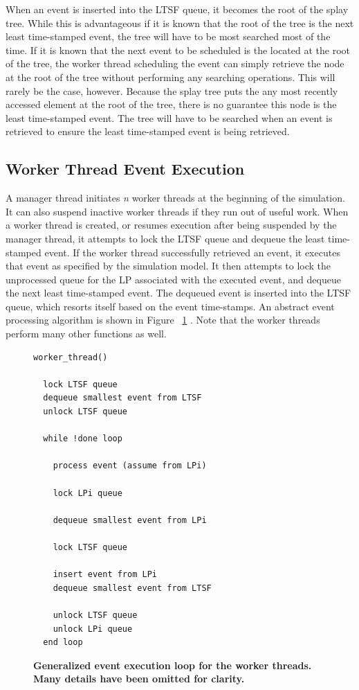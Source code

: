 \documentclass[11pt]{book}
\begin{document}
When an event is inserted into the LTSF queue, it becomes the root of the splay
tree.  While this is advantageous if it is known that the root of the tree is
the next least time-stamped event, the tree will have to be most searched most
of the time.  If it is known that the next event to be scheduled is the located
at the root of the tree, the worker thread scheduling the event can simply
retrieve the node at the root of the tree without performing any searching
operations.  This will rarely be the case, however.  Because the splay tree puts
the any most recently accessed element at the root of the tree, there is no
guarantee this node is the least time-stamped event.  The tree will have to be
searched when an event is retrieved to ensure the least time-stamped event is
being retrieved.

\subsection{Worker Thread Event Execution}

A manager thread initiates \emph{n} worker threads at the beginning of the simulation.  It
can also suspend inactive worker threads if they run out of useful work.  When a worker
thread is created, or resumes execution after being suspended by the manager thread, it
attempts to lock the LTSF queue and dequeue the least time-stamped event.  If the worker
thread successfully retrieved an event, it executes that event as specified by the
simulation model.  It then attempts to lock the unprocessed queue for the LP associated
with the executed event, and dequeue the next least time-stamped event.  The dequeued
event is inserted into the LTSF queue, which resorts itself based on the event
time-stamps.  An abstract event processing algorithm is shown in Figure
~\ref{workerThreadAlgorithm} \cite{dickman}.  Note that the worker threads perform many
other functions as well.

\begin{figure}
\begin{verbatim}
worker_thread()

  lock LTSF queue
  dequeue smallest event from LTSF
  unlock LTSF queue

  while !done loop

    process event (assume from LPi)

    lock LPi queue 

    dequeue smallest event from LPi

    lock LTSF queue

    insert event from LPi
    dequeue smallest event from LTSF

    unlock LTSF queue
    unlock LPi queue
  end loop
\end{verbatim}
\caption{\textbf{Generalized event execution loop for the worker threads.  Many details
    have been omitted for clarity.}}\label{workerThreadAlgorithm}
\end{figure}
\end{document}
